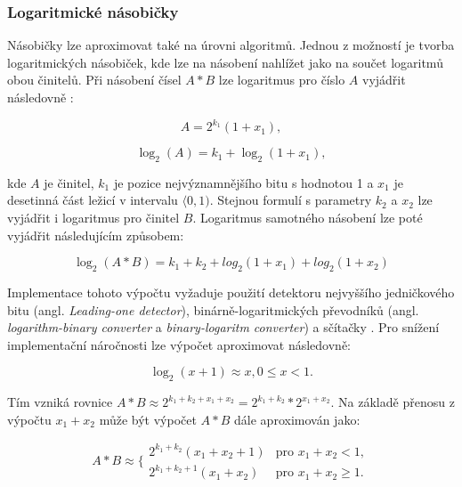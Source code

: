\subsubsection{Logaritmické násobičky}
Násobičky lze aproximovat také na úrovni algoritmů. Jednou z možností je tvorba logaritmických násobiček, kde lze na násobení nahlížet jako na součet logaritmů obou činitelů. Při násobení čísel $A * B$ lze logaritmus pro číslo $A$ vyjádřit následovně \cite{mitchell_log}:

\begin{equation}
    A = 2^{k_1}(1+x_1),
\end{equation}

\begin{equation}
    \log_2(A) = k_1 + \log_2(1+x_1),
\end{equation}

kde $A$ je činitel, $k_1$ je pozice nejvýznamnějšího bitu s hodnotou 1 a $x_1$ je desetinná část ležicí v intervalu $\langle0,1)$. Stejnou formulí s parametry $k_2$ a $x_2$ lze vyjádřit i logaritmus pro činitel $B$. Logaritmus samotného násobení lze poté vyjádřit následujícím způsobem:

\begin{equation}
    \log_2(A*B) = k_1 + k_2 + log_2(1+x_1) + log_2(1 + x_2)
\end{equation}

Implementace tohoto výpočtu vyžaduje použití detektoru nejvyššího jedničkového bitu (angl. \textit{Leading-one detector}), binárně-logaritmických převodníků (angl. \textit{logarithm-binary converter} a \textit{binary-logaritm converter}) a sčítačky \cite{approx_mult_survey}. Pro snížení implementační náročnosti lze výpočet aproximovat následovně:

\begin{equation}
    \log_2(x+1) \approx x, 0 \leq x < 1.
\end{equation}

Tím vzniká rovnice $A*B \approx 2^{k_1+k_2+x_1+x_2} = 2^{k_1+k_2} * 2^{x_1+x_2}$. Na základě přenosu z výpočtu $x_1 + x_2$ může být výpočet $A*B$ dále aproximován jako:

\begin{equation}
    A*B \approx \Bigg\{ 
    \begin{array}{ll}
        2^{k_1+k_2}(x_1+x_2+1) & \text{pro } x_1 + x_2 < 1, \\
        2^{k_1+k_2+1}(x_1+x_2) & \text{pro } x_1 + x_2 \geq 1.
    \end{array}
\end{equation}

